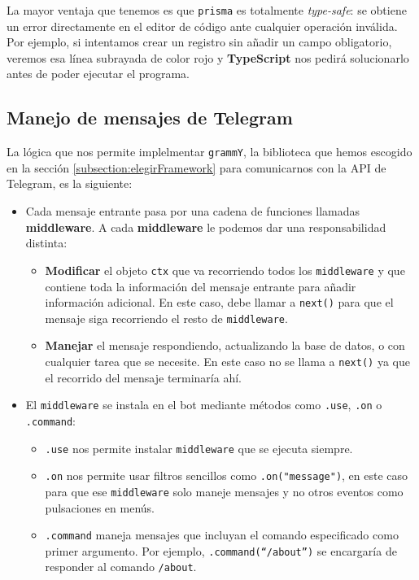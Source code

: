 La mayor ventaja que tenemos es que \texttt{prisma} es totalmente \textit{type-safe}: se obtiene un error directamente en el editor de código ante cualquier operación inválida. Por ejemplo, si intentamos crear un registro sin añadir un campo obligatorio, veremos esa línea subrayada de color rojo y \textbf{TypeScript} nos pedirá solucionarlo antes de poder ejecutar el programa.

\subsection{Manejo de mensajes de Telegram}

La lógica que nos permite implelmentar \texttt{grammY}, la biblioteca que hemos escogido en la sección \ref{subsection:elegirFramework} para comunicarnos con la API de Telegram, es la siguiente:

\begin{itemize}
    \item Cada mensaje entrante pasa por una cadena de funciones llamadas \textbf{middleware}. A cada \textbf{middleware} le podemos dar una responsabilidad distinta:
    \begin{itemize}
        \item \textbf{Modificar} el objeto \texttt{ctx} que va recorriendo todos los \texttt{middleware} y que contiene toda la información del mensaje entrante para añadir información adicional. En este caso, debe llamar a \texttt{next()} para que el mensaje siga recorriendo el resto de \texttt{middleware}.
        \item \textbf{Manejar} el mensaje respondiendo, actualizando la base de datos, o con cualquier tarea que se necesite. En este caso no se llama a \texttt{next()} ya que el recorrido del mensaje terminaría ahí.
    \end{itemize}
    \item El \texttt{middleware} se instala en el bot mediante métodos como \texttt{.use}, \texttt{.on} o \texttt{.command}:
    \begin{itemize}
        \item \texttt{.use} nos permite instalar \texttt{middleware} que se ejecuta siempre.
        \item \texttt{.on} nos permite usar filtros sencillos como \texttt{.on("message")}, en este caso para que ese \texttt{middleware} solo maneje mensajes y no otros eventos como pulsaciones en menús.
        \item \texttt{.command} maneja mensajes que incluyan el comando especificado como primer argumento. Por ejemplo, \texttt{.command(``/about'')} se encargaría de responder al comando \texttt{/about}.
    \end{itemize}
\end{itemize}

